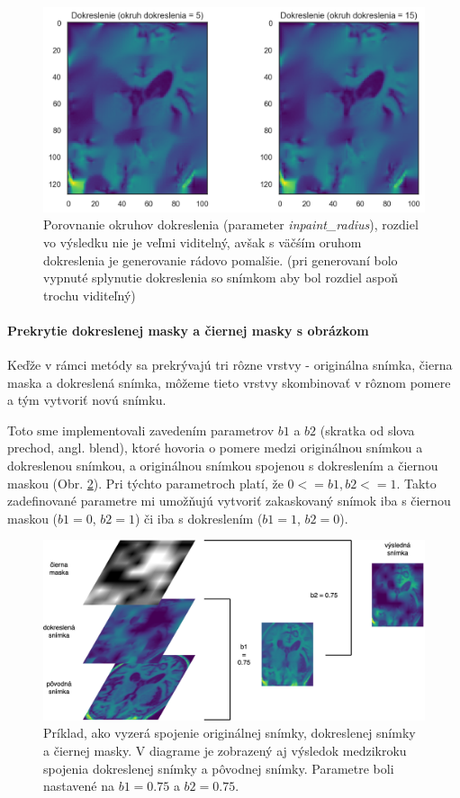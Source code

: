 \begin{figure}[H]
    \centering
    \includegraphics[width=13cm]{assets/images/inpaint_radius.png}
    \caption{Porovnanie okruhov dokreslenia (parameter \textit{inpaint\_radius}), rozdiel vo výsledku nie je veľmi viditelný, avšak s väčśím oruhom dokreslenia je generovanie rádovo pomalšie. (pri generovaní bolo vypnuté splynutie dokreslenia so snímkom aby bol rozdiel aspoň trochu viditeľný)}
    \label{fig:inpaint_radius}
\end{figure}

\paragraph{Prekrytie dokreslenej masky a čiernej masky s obrázkom}

Keďže v rámci metódy sa prekrývajú tri rôzne vrstvy - originálna snímka, čierna maska a dokreslená snímka, môžeme tieto vrstvy skombinovať v rôznom pomere a tým vytvoriť novú snímku.

Toto sme implementovali zavedením parametrov $b1$ a $b2$ (skratka od slova prechod, angl. blend), ktoré hovoria o pomere medzi originálnou snímkou a dokreslenou snímkou, a originálnou snímkou spojenou s dokreslením a čiernou maskou (Obr. \ref{fig:risei_layers}). Pri týchto parametroch platí, že $0 <= b1, b2 <= 1$. Takto zadefinované parametre mi umožňujú vytvoriť zakaskovaný snímok iba s čiernou maskou ($b1 = 0$, $b2 = 1$) či iba s dokreslením ($b1 = 1$, $b2 = 0$).

\begin{figure}[H]
    \centering
    \includegraphics[width=13cm]{assets/images/risei_layers.png}
    \caption{Príklad, ako vyzerá spojenie originálnej snímky, dokreslenej snímky a čiernej masky. V diagrame je zobrazený aj výsledok medzikroku spojenia dokreslenej snímky a pôvodnej snímky. Parametre boli nastavené na $b1 = 0.75$ a $b2 = 0.75$.}
    \label{fig:risei_layers}
\end{figure}

